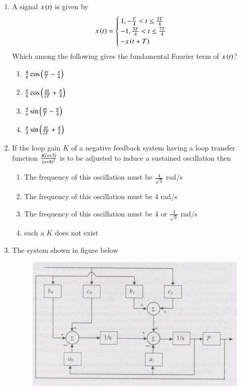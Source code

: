 \documentclass[journal]{IEEEtran}
\begin{document}
\begin{enumerate}
\item A signal $x\left(t\right)$ is given by 
\begin{align*}
    x\left(t\right) = 
    \begin{cases}
        1, -\frac{T}{4} < t \leq \frac{3T}{4} \\
        -1, \frac{3T}{4} < t \leq \frac{7T}{4} \\
        -x\left(t + T\right)
    \end{cases}
\end{align*}
Which among the following gives the fundamental Fourier term of $x\left(t\right)$? 
\begin{enumerate}
    \item $\frac{4}{\pi}\cos\left(\frac{\pi t}{T} - \frac{\pi}{4}\right)$
    \item $\frac{\pi}{4}\cos\left(\frac{\pi t}{2T} + \frac{\pi}{4}\right)$
    \item $\frac{4}{\pi}\sin\left(\frac{\pi t}{T} - \frac{\pi}{4}\right)$
    \item $\frac{\pi}{4}\sin\left(\frac{\pi t}{2T} + \frac{\pi}{4}\right)$ \\
\end{enumerate}
 \item If the loop gain $K$ of a negative feedback system having a loop transfer function $\frac{K\left(s+3\right)}{\left(s+8\right)^2}$ is to be adjusted to induce a sustained oscillation then
 \begin{enumerate}
     \item The frequency of this oscillation must be $\frac{4}{\sqrt{3}}$ rad/s
     \item The frequency of this oscillation must be 4 rad/s
     \item The frequency of this oscillation must be 4 or $\frac{4}{\sqrt{3}}$ rad/s
     \item such a $K$ does not exist \\
 \end{enumerate}
\item The system shown in figure below
\begin{figure}[h!]
	    \centering
	    \includegraphics[width=0.7\linewidth]{figs/Q5.1.png}

\end{figure}
\end{enumerate}
\end{document}
